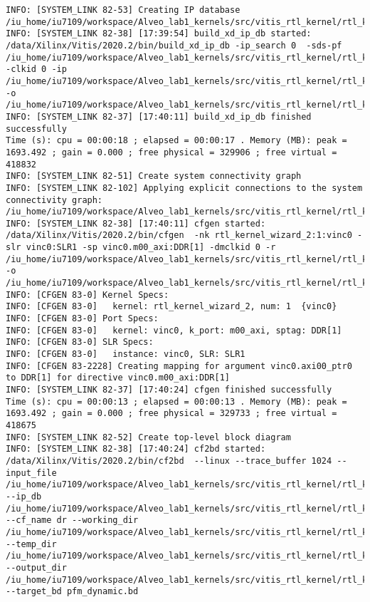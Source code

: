 \begin{center}
\begin{lstlisting}[label=lst:vlog,caption=Файл v++\_vinc.log]
INFO: [SYSTEM_LINK 82-53] Creating IP database /iu_home/iu7109/workspace/Alveo_lab1_kernels/src/vitis_rtl_kernel/rtl_kernel_wizard_2/_x/link/sys_link/_sysl/.cdb/xd_ip_db.xml
INFO: [SYSTEM_LINK 82-38] [17:39:54] build_xd_ip_db started: /data/Xilinx/Vitis/2020.2/bin/build_xd_ip_db -ip_search 0  -sds-pf /iu_home/iu7109/workspace/Alveo_lab1_kernels/src/vitis_rtl_kernel/rtl_kernel_wizard_2/_x/link/sys_link/xilinx_u200_xdma_201830_2.hpfm -clkid 0 -ip /iu_home/iu7109/workspace/Alveo_lab1_kernels/src/vitis_rtl_kernel/rtl_kernel_wizard_2/_x/link/sys_link/iprepo/mycompany_com_kernel_rtl_kernel_wizard_2_1_0,rtl_kernel_wizard_2 -o /iu_home/iu7109/workspace/Alveo_lab1_kernels/src/vitis_rtl_kernel/rtl_kernel_wizard_2/_x/link/sys_link/_sysl/.cdb/xd_ip_db.xml
INFO: [SYSTEM_LINK 82-37] [17:40:11] build_xd_ip_db finished successfully
Time (s): cpu = 00:00:18 ; elapsed = 00:00:17 . Memory (MB): peak = 1693.492 ; gain = 0.000 ; free physical = 329906 ; free virtual = 418832
INFO: [SYSTEM_LINK 82-51] Create system connectivity graph
INFO: [SYSTEM_LINK 82-102] Applying explicit connections to the system connectivity graph: /iu_home/iu7109/workspace/Alveo_lab1_kernels/src/vitis_rtl_kernel/rtl_kernel_wizard_2/_x/link/sys_link/cfgraph/cfgen_cfgraph.xml
INFO: [SYSTEM_LINK 82-38] [17:40:11] cfgen started: /data/Xilinx/Vitis/2020.2/bin/cfgen  -nk rtl_kernel_wizard_2:1:vinc0 -slr vinc0:SLR1 -sp vinc0.m00_axi:DDR[1] -dmclkid 0 -r /iu_home/iu7109/workspace/Alveo_lab1_kernels/src/vitis_rtl_kernel/rtl_kernel_wizard_2/_x/link/sys_link/_sysl/.cdb/xd_ip_db.xml -o /iu_home/iu7109/workspace/Alveo_lab1_kernels/src/vitis_rtl_kernel/rtl_kernel_wizard_2/_x/link/sys_link/cfgraph/cfgen_cfgraph.xml
INFO: [CFGEN 83-0] Kernel Specs: 
INFO: [CFGEN 83-0]   kernel: rtl_kernel_wizard_2, num: 1  {vinc0}
INFO: [CFGEN 83-0] Port Specs: 
INFO: [CFGEN 83-0]   kernel: vinc0, k_port: m00_axi, sptag: DDR[1]
INFO: [CFGEN 83-0] SLR Specs: 
INFO: [CFGEN 83-0]   instance: vinc0, SLR: SLR1
INFO: [CFGEN 83-2228] Creating mapping for argument vinc0.axi00_ptr0 to DDR[1] for directive vinc0.m00_axi:DDR[1]
INFO: [SYSTEM_LINK 82-37] [17:40:24] cfgen finished successfully
Time (s): cpu = 00:00:13 ; elapsed = 00:00:13 . Memory (MB): peak = 1693.492 ; gain = 0.000 ; free physical = 329733 ; free virtual = 418675
INFO: [SYSTEM_LINK 82-52] Create top-level block diagram
INFO: [SYSTEM_LINK 82-38] [17:40:24] cf2bd started: /data/Xilinx/Vitis/2020.2/bin/cf2bd  --linux --trace_buffer 1024 --input_file /iu_home/iu7109/workspace/Alveo_lab1_kernels/src/vitis_rtl_kernel/rtl_kernel_wizard_2/_x/link/sys_link/cfgraph/cfgen_cfgraph.xml --ip_db /iu_home/iu7109/workspace/Alveo_lab1_kernels/src/vitis_rtl_kernel/rtl_kernel_wizard_2/_x/link/sys_link/_sysl/.cdb/xd_ip_db.xml --cf_name dr --working_dir /iu_home/iu7109/workspace/Alveo_lab1_kernels/src/vitis_rtl_kernel/rtl_kernel_wizard_2/_x/link/sys_link/_sysl/.xsd --temp_dir /iu_home/iu7109/workspace/Alveo_lab1_kernels/src/vitis_rtl_kernel/rtl_kernel_wizard_2/_x/link/sys_link --output_dir /iu_home/iu7109/workspace/Alveo_lab1_kernels/src/vitis_rtl_kernel/rtl_kernel_wizard_2/_x/link/int --target_bd pfm_dynamic.bd

\end{lstlisting}
\end{center}
